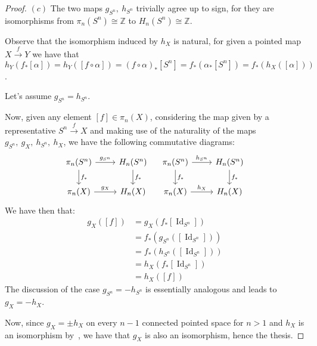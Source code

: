 \documentclass{article}
\newcommand{\numberset}{\mathbb}
\newcommand{\Z}{\numberset{Z}}
\newcommand{\exercise}[1]{\noindent {\bf Exercise #1}}
\DeclareMathOperator{\Id}{Id}
\begin{document}
\begin{proof}
    $(c)$ The two maps $g_{S^n},\ h_{S^n}$ trivially agree up to sign, for they
    are isomorphisms from $\pi_n(S^n)\cong\Z$ to $H_n(S^n)\cong\Z$.

    Observe that the isomorphism induced by $h_X$ is natural, for given a
    pointed map $X\xrightarrow{f} Y$ we have that
    $h_Y(f_*[\alpha])=h_Y([f\circ\alpha])=(f\circ\alpha)_*[S^n]=
    f_*(\alpha_*[S^n])=f_*(h_X([\alpha]))$.

    Let's assume $g_{S^n}=h_{S^n}$.

    Now, given any element $[f]\in\pi_n(X)$, considering the map given by a
    representative $S^n\xrightarrow{f}X$ and making use of the naturality of the
    maps $g_{S^n},\ g_X,\ h_{S^n},\ h_X$, we have the following commutative
    diagrams:
    \[
        \begin{tikzcd}
            \pi_n(S^n)\arrow{r}{g_{S^n}}\arrow{d}{f_*}
            & H_n(S^n)\arrow{d}{f_*} \\
            \pi_n(X)\arrow{r}{g_X}
            & H_n(X)
        \end{tikzcd}
        \quad
        \begin{tikzcd}
            \pi_n(S^n)\arrow{r}{h_{S^n}}\arrow{d}{f_*}
            & H_n(S^n)\arrow{d}{f_*} \\
            \pi_n(X)\arrow{r}{h_X}
            & H_n(X)
        \end{tikzcd}
    \]
    We have then that:
    \begin{align*}
        g_X([f]) &=g_X(f_*[\Id_{S^n}]) \\
        &=f_*(g_{S^n}([\Id_{S^n}])) \\
        &=f_*(h_{S^n}([\Id_{S^n}])) \\
        &=h_X(f_*[\Id_{S^n}]) \\
        &=h_X([f])
    \end{align*}
    The discussion of the case $g_{S^n}=-h_{S^n}$ is essentially analogous and
    leads to $g_X=-h_X$.

    Now, since $g_X=\pm h_X$ on every $n-1$ connected pointed space for $n>1$
    and $h_X$ is an isomorphism by~\cite[thm. 11.6]{HM19}, we have that $g_X$ is
    also an isomorphism, hence the thesis.
\end{proof}


~\\
\exercise{3}
\end{document}
